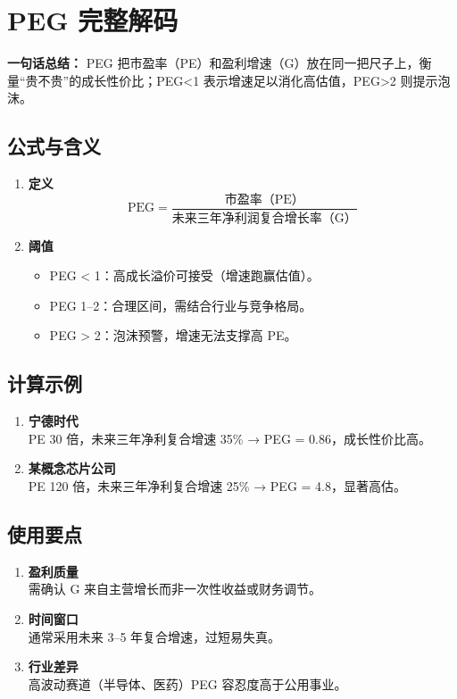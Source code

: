 \section{PEG 完整解码}
\textbf{一句话总结：}  
PEG 把市盈率（PE）和盈利增速（G）放在同一把尺子上，衡量“贵不贵”的成长性价比；PEG<1 表示增速足以消化高估值，PEG>2 则提示泡沫。

\subsection{公式与含义}
\begin{enumerate}[leftmargin=*, nosep]
    \item \textbf{定义}  
   {\color{red}
    \[
    \text{PEG} = \frac{\text{市盈率（PE）}}{\text{未来三年净利润复合增长率（G）}}
    \]
   }
    \item \textbf{阈值}  
    \begin{itemize}[nosep]  
        \item PEG < 1：高成长溢价可接受（增速跑赢估值）。  
        \item PEG 1–2：合理区间，需结合行业与竞争格局。  
        \item PEG > 2：泡沫预警，增速无法支撑高 PE。
    \end{itemize}
\end{enumerate}

\subsection{计算示例}
\begin{enumerate}[leftmargin=*, nosep]
    \item \textbf{宁德时代}  \\
    PE 30 倍，未来三年净利复合增速 35\% → PEG = 0.86，成长性价比高。  
    \item \textbf{某概念芯片公司}  \\
    PE 120 倍，未来三年净利复合增速 25\% → PEG = 4.8，显著高估。
\end{enumerate}

\subsection{使用要点}
\begin{enumerate}[leftmargin=*, nosep]
    \item \textbf{盈利质量}  \\
    {\color{red}需确认 G 来自主营增长而非一次性收益或财务调节。  }
    \item \textbf{时间窗口}  \\
    {\color{red}通常采用未来 3–5 年复合增速，过短易失真。  }
    \item \textbf{行业差异}  \\
    高波动赛道（半导体、医药）PEG 容忍度高于公用事业。  
\end{enumerate}

